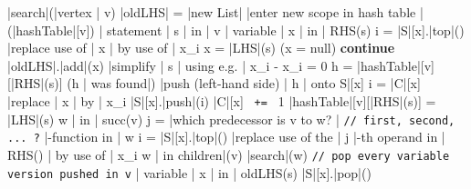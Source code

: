 \documentclass[a4paper,12pt, notitlepage]{article}
\begin{document}
\pagebreak
\begin{program}
\PROC |search|(|vertex | v) \BODY
    |oldLHS| = |new List|
    |enter new scope in hash table | (|hashTable|[v])
    \FOREACH | statement | s | in | v \DO
        \FOREACH | variable | x | in | RHS(s) \DO
            i = |S|[x].|top|()
            |replace use of | x | by use of | x_i
        \OD
        x = |LHS|(s)
        \IF (x = null) \AR*
            \textbf{continue}
        \FI
        |oldLHS|.|add|(x)
        |simplify | s | using e.g. | x_i - x_i = 0
        h = |hashTable|[v][|RHS|(s)]
        \IF (h | was found|) \AR*
            |push (left-hand side) | h | onto S|[x]
        \ELSE
            i = |C|[x]
            |replace | x | by | x_i
            |S|[x].|push|(i)
            |C|[x] \texttt{ += } 1
            |hashTable|[v][|RHS|(s)] = |LHS|(s)
        \FI
    \OD
    \FOREACH w | in | succ(v) \DO
        j = |which predecessor is v to w? | \hspace{1cm} \texttt{// first, second, ... ?}
        \FOREACH \Phi|-function in | w \DO
            i = |S|[x].|top|()
            |replace use of the | j |-th operand in | RHS(\Phi) | by use of | x_i
        \OD
    \OD
    \FOREACH w | in children|(v) \DO
        |search|(w)
    \texttt{// pop every variable version pushed in v}
    \FOREACH | variable | x | in | oldLHS(s) \DO
        |S|[x].|pop|()
    \OD

\end{program}

\end{document}
